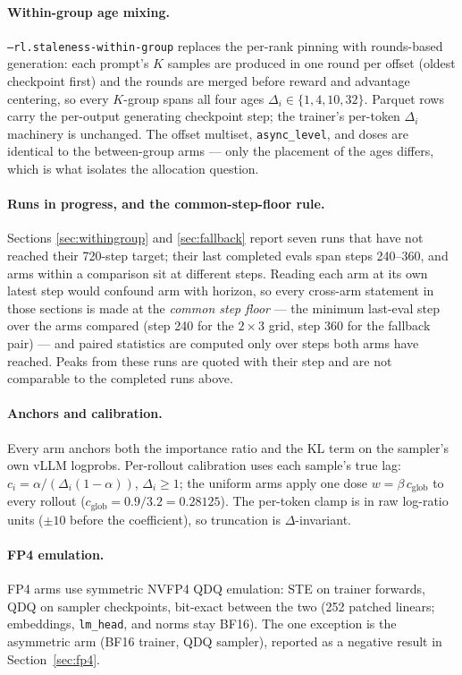 \documentclass[11pt]{amsart}
\begin{document}
\paragraph{Within-group age mixing.} \texttt{--rl.staleness-within-group}
replaces the per-rank pinning with rounds-based generation: each prompt's $K$
samples are produced in one round per offset (oldest checkpoint first) and the
rounds are merged before reward and advantage centering, so every $K$-group
spans all four ages $\Delta_i \in \{1,4,10,32\}$. Parquet rows carry the
per-output generating checkpoint step; the trainer's per-token $\Delta_i$
machinery is unchanged. The offset multiset, \texttt{async\_level}, and doses
are identical to the between-group arms --- only the placement of the ages
differs, which is what isolates the allocation question.

\paragraph{Runs in progress, and the common-step-floor rule.} Sections
\ref{sec:withingroup} and \ref{sec:fallback} report seven runs that have not
reached their 720-step target; their last completed evals span steps
240--360, and arms within a comparison sit at different steps. Reading each
arm at its own latest step would confound arm with horizon, so every
cross-arm statement in those sections is made at the \emph{common step
floor} --- the minimum last-eval step over the arms compared (step 240 for
the $2\times3$ grid, step 360 for the fallback pair) --- and paired
statistics are computed only over steps both arms have reached. Peaks from
these runs are quoted with their step and are not comparable to the completed
runs above.

\paragraph{Anchors and calibration.} Every arm anchors both the importance
ratio and the KL term on the sampler's own vLLM logprobs. Per-rollout
calibration uses each sample's true lag: $c_i = \alpha/(\Delta_i(1-\alpha))$,
$\Delta_i \ge 1$; the uniform arms apply one dose $w = \beta\,c_{\mathrm{glob}}$
to every rollout ($c_{\mathrm{glob}} = 0.9/3.2 = 0.28125$). The per-token
clamp is in raw log-ratio units ($\pm 10$ before the coefficient), so
truncation is $\Delta$-invariant.

\paragraph{FP4 emulation.} FP4 arms use symmetric NVFP4 QDQ emulation: STE
on trainer forwards, QDQ on sampler checkpoints, bit-exact between the two
(252 patched linears; embeddings, \texttt{lm\_head}, and norms stay BF16).
The one exception is the asymmetric arm (BF16 trainer, QDQ sampler),
reported as a negative result in Section~\ref{sec:fp4}.
\end{document}
